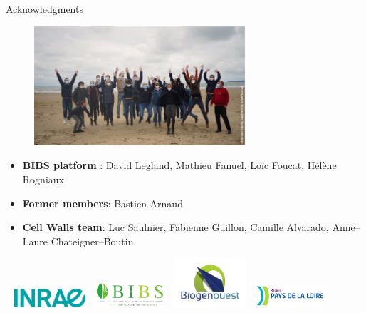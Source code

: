 \documentclass[10pt]{beamer}
\begin{document}
\begin{frame}[plain]{Acknowledgments}
  \begin{figure}[ht]
      \centering
      \includegraphics[width=0.7\textwidth]{fig/photoequipe}
    \end{figure}
    
    {\scriptsize
  \begin{itemize}
  \item \textbf{BIBS platform} : David Legland, Mathieu Fanuel, Loïc Foucat, Hélène Rogniaux
  \item \textbf{Former members}: Bastien Arnaud
  \item \textbf{Cell Walls team}: Luc Saulnier, Fabienne Guillon, Camille Alvarado, Anne--Laure Chateigner--Boutin
  \end{itemize}
}
\vspace{-0.7cm}
  \hspace*{0.01\textwidth}~%
  \includegraphics[width=0.2\textwidth]{fig/logo-inrae}\hspace*{0.075\textwidth}~%
  \includegraphics[width=0.2\textwidth]{fig/logo-bibs.png}\hspace*{0.075\textwidth}~%
  \includegraphics[width=0.2\textwidth]{fig/logo-biogenouest}\hspace*{0.075\textwidth}~%
  \includegraphics[width=0.2\textwidth]{fig/logo-region}\hspace*{0.01\textwidth}~%

\end{frame}
\end{document}
